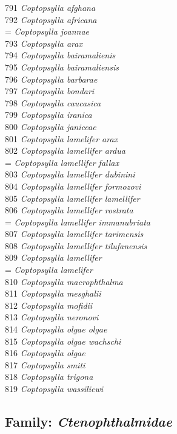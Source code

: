 \documentclass[
]{article}
\begin{document}
791 \emph{Coptopsylla afghana}\\
792 \emph{Coptopsylla africana}\\
= \emph{Coptopsylla joannae}\\
793 \emph{Coptopsylla arax}\\
794 \emph{Coptopsylla bairamalienis}\\
795 \emph{Coptopsylla bairamaliensis}\\
796 \emph{Coptopsylla barbarae}\\
797 \emph{Coptopsylla bondari}\\
798 \emph{Coptopsylla caucasica}\\
799 \emph{Coptopsylla iranica}\\
800 \emph{Coptopsylla janiceae}\\
801 \emph{Coptopsylla lamelifer arax}\\
802 \emph{Coptopsylla lamellifer ardua}\\
= \emph{Coptopsylla lamellifer fallax}\\
803 \emph{Coptopsylla lamellifer dubinini}\\
804 \emph{Coptopsylla lamellifer formozovi}\\
805 \emph{Coptopsylla lamellifer lamellifer}\\
806 \emph{Coptopsylla lamellifer rostrata}\\
= \emph{Coptopsylla lamellifer immanubriata}\\
807 \emph{Coptopsylla lamellifer tarimensis}\\
808 \emph{Coptopsylla lamellifer tilufanensis}\\
809 \emph{Coptopsylla lamellifer}\\
= \emph{Coptopsylla lamelifer}\\
810 \emph{Coptopsylla macrophthalma}\\
811 \emph{Coptopsylla mesghalii}\\
812 \emph{Coptopsylla mofidii}\\
813 \emph{Coptopsylla neronovi}\\
814 \emph{Coptopsylla olgae olgae}\\
815 \emph{Coptopsylla olgae wachschi}\\
816 \emph{Coptopsylla olgae}\\
817 \emph{Coptopsylla smiti}\\
818 \emph{Coptopsylla trigona}\\
819 \emph{Coptopsylla wassiliewi}

\hypertarget{family-ctenophthalmidae}{%
\subsection{\texorpdfstring{Family:
\emph{Ctenophthalmidae}}{Family: Ctenophthalmidae}}\label{family-ctenophthalmidae}}
\end{document}
